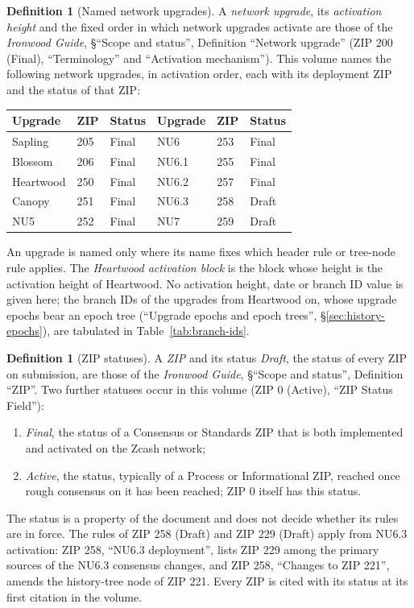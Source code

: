 \documentclass[11pt,a4paper]{article}
\theoremstyle{definition}
\newtheorem{definition}[theorem]{Definition}
\begin{document}
\begin{definition}[Named network upgrades]\label{def:upgrades}
A \emph{network upgrade}, its \emph{activation height} and the fixed order in
which network upgrades activate are those of the \emph{Ironwood Guide},
\S``Scope and status'', Definition ``Network upgrade'' (ZIP 200 (Final),
``Terminology'' and ``Activation mechanism''). This volume names the
following network upgrades, in activation order, each with its deployment ZIP
and the status of that ZIP:
\begin{center}
\small
\begin{tabular}{@{}l l l@{\qquad}l l l@{}}
\toprule
Upgrade & ZIP & Status & Upgrade & ZIP & Status \\
\midrule
Sapling & 205 & Final & NU6 & 253 & Final \\
Blossom & 206 & Final & NU6.1 & 255 & Final \\
Heartwood & 250 & Final & NU6.2 & 257 & Final \\
Canopy & 251 & Final & NU6.3 & 258 & Draft \\
NU5 & 252 & Final & NU7 & 259 & Draft \\
\bottomrule
\end{tabular}
\end{center}
An upgrade is named only where its name fixes which header rule or tree-node
rule applies. The \emph{Heartwood activation block} is the block whose height
is the activation height of Heartwood. No activation height, date or branch
ID value is given here; the branch IDs of the upgrades from Heartwood on,
whose upgrade epochs bear an epoch tree (``Upgrade epochs and epoch trees'',
\S\ref{sec:history-epochs}), are tabulated in Table~\ref{tab:branch-ids}.
\end{definition}

\begin{definition}[ZIP statuses]\label{def:zip-status}
A \emph{ZIP} and its status \emph{Draft}, the status of every ZIP on
submission, are those of the \emph{Ironwood Guide}, \S``Scope and status'',
Definition ``ZIP''. Two further statuses occur in this volume
(ZIP 0 (Active), ``ZIP Status Field''):
\begin{enumerate}[label=(\roman*)]
\item \emph{Final}, the status of a Consensus or Standards ZIP that is both
  implemented and activated on the Zcash network;
\item \emph{Active}, the status, typically of a Process or Informational
  ZIP, reached once rough consensus on it has been reached; ZIP 0 itself has
  this status.
\end{enumerate}
The status is a property of the document and does not decide whether its
rules are in force. The rules of ZIP 258 (Draft) and ZIP 229 (Draft) apply
from NU6.3 activation: ZIP 258, ``NU6.3 deployment'', lists ZIP 229 among
the primary sources of the NU6.3 consensus changes, and ZIP 258, ``Changes to
ZIP 221'', amends the history-tree node of ZIP 221. Every ZIP is cited with
its status at its first citation in the volume.
\end{definition}
\end{document}
